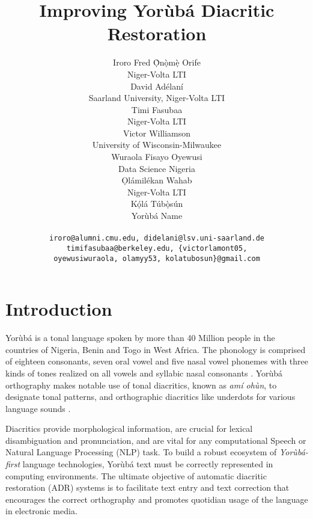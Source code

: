 \documentclass{article} %
\title{Improving Yor{\`u}b{\'a} Diacritic Restoration}
\author{Iroro Fred \d{\`O}n\d{\`o}m\d{\`e} Orife \\
Niger-Volta LTI\\
\And
David Ad{\'e}lan{\'i} \\
Saarland University, Niger-Volta LTI \\
\And
Timi Fasubaa \\
Niger-Volta LTI \\
\And
Victor Williamson \\
University of Wisconsin-Milwaukee \\
\And
Wuraola Fisayo Oyewusi\\
Data Science Nigeria \\
\And
\d{O}l{\'a}mil{\'e}kan Wahab \\
Niger-Volta LTI \\
\And
K\d{\'{o}}l\'{a} T\'{u}b\d{\`{o}}s\'{u}n \\
Yor{\`u}b{\'a} Name \\
\\
\texttt{\footnotesize iroro@alumni.cmu.edu, didelani@lsv.uni-saarland.de} \vspace*{-.2em} \\
\texttt{\footnotesize timifasubaa@berkeley.edu,  \{victorlamont05,} \vspace*{-.2em} \\
\texttt{\footnotesize oyewusiwuraola, olamyy53, kolatubosun\}@gmail.com}
}
\begin{document}
\maketitle


\section{Introduction}\label{sec:introduction}

Yor{\`u}b{\'a} is a tonal language spoken by more than 40 Million people in the countries of Nigeria, Benin and Togo in West Africa. The phonology is comprised of eighteen consonants, seven oral vowel and five nasal vowel phonemes with three kinds of tones realized on all vowels and syllabic nasal consonants \citep{akinlabi2004sound}. Yor{\`u}b{\'a} orthography makes notable use of tonal diacritics, known as \emph{am{\'i} oh{\`u}n}, to designate tonal patterns, and orthographic diacritics like underdots for various language sounds \citep{adegbola2012quantifying, wells2000orthographic}.

Diacritics provide morphological information, are crucial for lexical disambiguation and pronunciation, and are vital for any computational Speech or Natural Language Processing (NLP) task. To build a robust ecosystem of \emph{Yor{\`u}b{\'a}-first} language technologies, Yor{\`u}b{\'a} text must be correctly represented in computing environments. The ultimate objective of automatic diacritic restoration (ADR) systems is to facilitate text entry and text correction that encourages the correct orthography and promotes quotidian usage of the language in electronic media.
\end{document}
